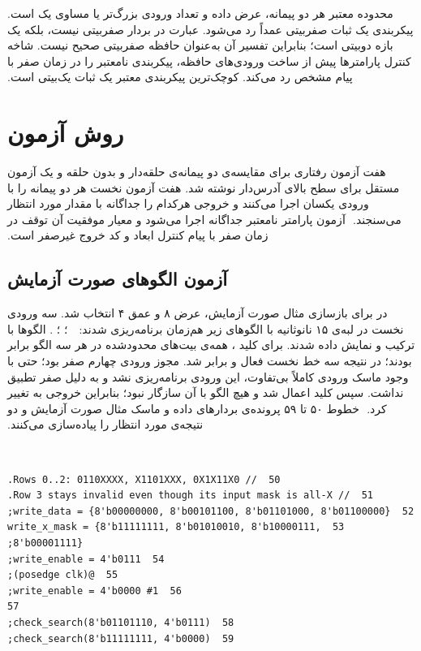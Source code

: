 ‫
‫محدوده معتبر هر دو پیمانه، عرض داده و تعداد ورودی بزرگ‌تر یا مساوی یک است. پیکربندی یک ثبات صفر‌بیتی عمداً رد می‌شود. عبارت  در  بردار صفر‌بیتی نیست، بلکه یک بازه دو‌بیتی است؛ بنابراین تفسیر آن به‌عنوان حافظه صفر‌بیتی صحیح نیست. شاخه کنترل پارامترها پیش از ساخت ورودی‌های حافظه، پیکربندی نامعتبر را در زمان صفر با پیام مشخص رد می‌کند. کوچک‌ترین پیکربندی معتبر یک ثبات یک‌بیتی است.
‫
‫\section{روش آزمون}
‫
‫هفت آزمون رفتاری برای مقایسه‌ی دو پیمانه‌ی حلقه‌دار و بدون حلقه و یک آزمون مستقل برای سطح بالای آدرس‌دار نوشته شد. هفت آزمون نخست هر دو پیمانه را با
‫ورودی یکسان اجرا می‌کنند و خروجی هرکدام را جداگانه با مقدار مورد انتظار می‌سنجند.
‫
‫آزمون پارامتر نامعتبر جداگانه اجرا می‌شود و معیار موفقیت آن توقف در زمان صفر با
‫پیام کنترل ابعاد و کد خروج غیرصفر است.
‫
‫\subsection{آزمون الگوهای  صورت آزمایش}
‫
‫در  برای بازسازی مثال صورت آزمایش، عرض ۸ و عمق ۴ انتخاب
‫شد. سه ورودی نخست در لبه‌ی ۱۵ نانوثانیه با الگوهای زیر هم‌زمان برنامه‌ریزی شدند:
‫
‫
‫ ؛
‫ ؛
‫ .
‫
‫
‫الگوها با ترکیب  و  نمایش داده شدند. برای کلید
‫، همه‌ی بیت‌های محدودشده در هر سه الگو برابر بودند؛ در نتیجه سه خط نخست
‫فعال و  برابر  شد. مجوز ورودی چهارم صفر بود؛ حتی با
‫وجود ماسک ورودی کاملاً بی‌تفاوت، این ورودی برنامه‌ریزی نشد و به دلیل  صفر
‫تطبیق نداشت. سپس کلید  اعمال شد و هیچ الگو با آن سازگار نبود؛
‫بنابراین خروجی به  تغییر کرد.
‫
‫خطوط ۵۰ تا ۵۹ پرونده‌ی  بردارهای داده و ماسک مثال صورت
‫آزمایش و دو نتیجه‌ی مورد انتظار را پیاده‌سازی می‌کنند.
‫
‫\begin{dsdlcodeblock}
‫\begin{verbatim}
‫50  // Rows 0..2: 0110XXXX, X1101XXX, 0X1X11X0.
‫51  // Row 3 stays invalid even though its input mask is all-X.
‫52  write_data = {8'b00000000, 8'b00101100, 8'b01101000, 8'b01100000};
‫53  write_x_mask = {8'b11111111, 8'b01010010, 8'b10000111, 8'b00001111};
‫54  write_enable = 4'b0111;
‫55  @(posedge clk);
‫56  #1 write_enable = 4'b0000;
‫57
‫58  check_search(8'b01101110, 4'b0111);
‫59  check_search(8'b11111111, 4'b0000);
‫\end{verbatim}
‫\end{dsdlcodeblock}
